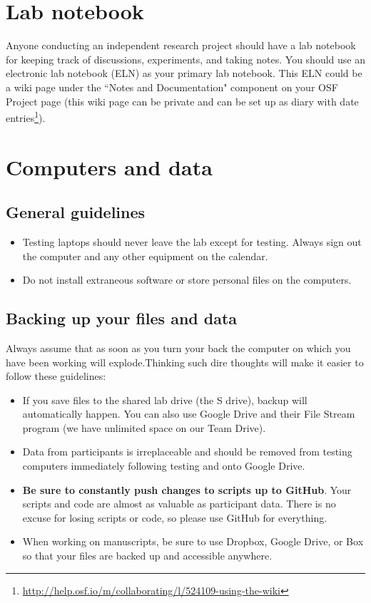 \documentclass[letterpaper,12pt,oneside]{memoir}
\begin{document}
\section{Lab notebook}
\label{sec:lab_notebook}

Anyone conducting an independent research project should have a lab notebook for keeping track of discussions, experiments, and taking notes. You should use an electronic lab notebook (ELN) as your primary lab notebook. This ELN could be a wiki page under the ``Notes and Documentation" component on your OSF Project page (this wiki page can be private and can be set up as diary with date entries\footnote{\url{http://help.osf.io/m/collaborating/l/524109-using-the-wiki}}).

\section{Computers and data}

\subsection{General guidelines}

\begin{itemize}
\item Testing laptops should never leave the lab except for testing. Always sign out the computer and any other equipment on the calendar.
\item Do not install extraneous software or store personal files on the computers.
\end{itemize}

\subsection{Backing up your files and data}

Always assume that as soon as you turn your back the computer on which you have been working will explode.Thinking such dire thoughts will make it easier to follow these guidelines:

\begin{itemize}
\item If you save files to the shared lab drive (the S drive), backup will automatically happen. You can also use Google Drive and their File Stream program (we have unlimited space on our Team Drive). 
\item Data from participants is irreplaceable and should be removed from testing computers immediately following testing and onto Google Drive.
\item \textbf{Be sure to constantly push changes to scripts up to GitHub}. Your scripts and code are almost as valuable as participant data. There is no excuse for losing scripts or code, so please use GitHub for everything.
\item When working on manuscripts, be sure to use Dropbox, Google Drive, or Box so that your files are backed up and accessible anywhere.
\end{itemize}
\end{document}
